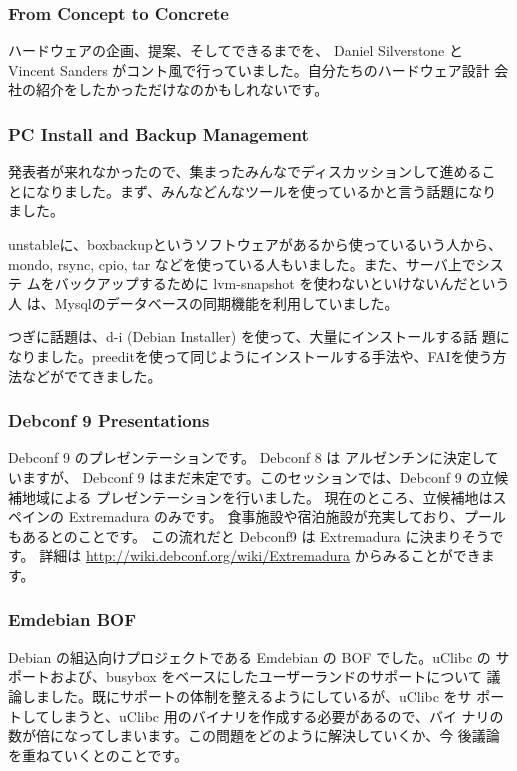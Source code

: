 \documentclass[mingoth,a4paper]{jsarticle}
\begin{document}
\subsubsection{From Concept to Concrete}
  ハードウェアの企画、提案、そしてできるまでを、 Daniel Silverstone と 
  Vincent Sanders がコント風で行っていました。自分たちのハードウェア設計
  会社の紹介をしたかっただけなのかもしれないです。

\subsubsection{PC Install and Backup Management}
  発表者が来れなかったので、集まったみんなでディスカッションして進めるこ
  とになりました。まず、みんなどんなツールを使っているかと言う話題になり
  ました。

  unstableに、boxbackupというソフトウェアがあるから使っているいう人から、
  mondo, rsync, cpio, tar などを使っている人もいました。また、サーバ上でシステ
  ムをバックアップするために lvm-snapshot を使わないといけないんだという人
  は、Mysqlのデータベースの同期機能を利用していました。

  つぎに話題は、d-i (Debian Installer) を使って、大量にインストールする話
  題になりました。preeditを使って同じようにインストールする手法や、FAIを使う方
  法などがでてきました。


\subsubsection{Debconf 9 Presentations}
  Debconf 9 のプレゼンテーションです。
  Debconf 8 は アルゼンチンに決定していますが、
  Debconf 9 はまだ未定です。このセッションでは、Debconf 9 の立候補地域による
  プレゼンテーションを行いました。
  現在のところ、立候補地はスペインの Extremadura のみです。
  食事施設や宿泊施設が充実しており、プールもあるとのことです。
  この流れだと Debconf9 は Extremadura に決まりそうです。
  詳細は \url{http://wiki.debconf.org/wiki/Extremadura} からみることができます。

\subsubsection{Emdebian BOF}

  Debian の組込向けプロジェクトである Emdebian の BOF でした。uClibc の
  サポートおよび、busybox をベースにしたユーザーランドのサポートについて
  議論しました。既にサポートの体制を整えるようにしているが、uClibc をサ
  ポートしてしまうと、uClibc 用のバイナリを作成する必要があるので、バイ
  ナリの数が倍になってしまいます。この問題をどのように解決していくか、今
  後議論を重ねていくとのことです。
\end{document}
